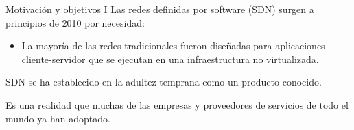 \documentclass[10pt,spanish,xcolor={svgnames}]{beamer}
\begin{document}
\begin{frame}{Motivación y objetivos I}
\vspace{-2em}
Las redes definidas por software (SDN) surgen a principios de 2010 \alert{por necesidad}:
\begin{itemize}
	\item La mayoría de las redes tradicionales fueron diseñadas para aplicaciones cliente-servidor que se ejecutan en una infraestructura no virtualizada.
\end{itemize}

SDN se ha establecido en la adultez temprana como un producto conocido.

Es una realidad que muchas de las empresas y proveedores de servicios de todo el mundo ya han adoptado.


\end{frame}
\end{document}
